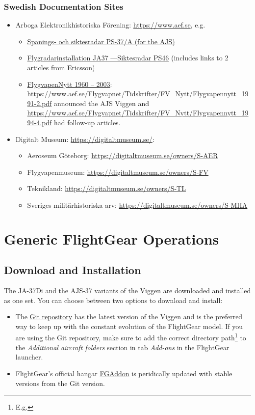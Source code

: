 \subsection{Swedish Documentation Sites}
\begin{itemize}
\item Arboga Elektronikhistoriska Förening: \url{https://www.aef.se}, e.g. 
\begin{itemize}
\item \href{https://www.aef.se/Avionik/Notiser/PS-37/PS-37A.htm}{Spanings- och siktesradar PS-37/A (for the AJS)}
\item \href{https://www.aef.se/Avionik/Notiser/Siktesradar_PS-46_1.htm}{Flygradarinstallation JA37 ---Siktesradar PS46} (includes links to 2 articles from Ericsson)
\item \href{https://www.aef.se/Flygvapnet/Tidskrifter/FV_Nytt/FVN_oversikt.htm}{FlygvapenNytt 1960 – 2003}: \url{https://www.aef.se/Flygvapnet/Tidskrifter/FV_Nytt/Flygvapennytt_1991-2.pdf} announced the AJS Viggen and \url{https://www.aef.se/Flygvapnet/Tidskrifter/FV_Nytt/Flygvapennytt_1994-4.pdf} had follow-up articles.
\end{itemize}
\item Digitalt Museum: \url{https://digitaltmuseum.se/}:
\begin{itemize}
\item Aeroseum Göteborg: \url{https://digitaltmuseum.se/owners/S-AER}
\item Flygvapenmuseum: \url{https://digitaltmuseum.se/owners/S-FV}
\item Teknikland: \url{https://digitaltmuseum.se/owners/S-TL}
\item Sveriges militärhistoriska arv: \url{https://digitaltmuseum.se/owners/S-MHA}
\end{itemize}
\end{itemize} 


\chapter{Generic FlightGear Operations}
\section{Download and Installation}
The JA-37Di and the AJS-37 variants of the Viggen are downloaded and installed as one set. You can choose between two options to download and install:
\begin{itemize}
\item The \href{https://github.com/NikolaiVChr/flightgear-saab-ja-37-viggen}{Git repository} has the latest version of the Viggen and is the preferred way to keep up with the constant evolution of the FlightGear model. If you are using the Git repository, make sure to add the correct directory path\footnote{E.g. } to the \emph{Additional aircraft folders} section in tab \emph{Add-ons} in the FlightGear launcher.
\item FlightGear's official hangar \href{http://wiki.flightgear.org/FGAddon}{FGAddon} is peridically updated with stable versions from the Git version. 
\end{itemize}

